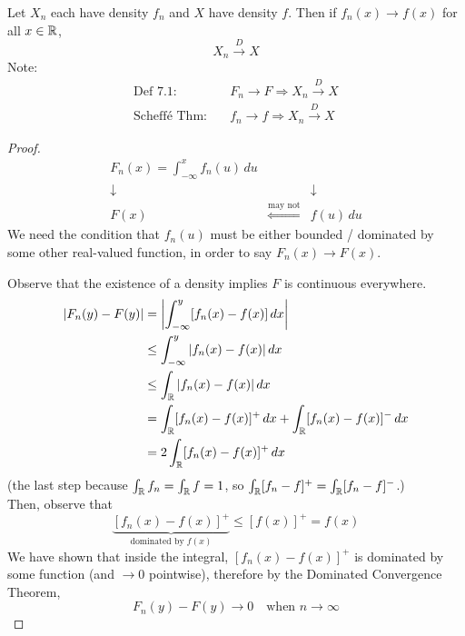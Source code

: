 \begin{theorem}
    Let $X_n$ each have density $f_n$ and $X$ have density $f$. Then if $f_n(x) \to f(x)$ for all $x \in \mathbb{R}$,
    \[X_n \overset{D}{\longrightarrow} X\]
    Note:
    \begin{align*}
        \text{Def 7.1:} & \quad F_n \to F \Rightarrow X_n \overset{D}{\longrightarrow} X\\
        \text{Scheff\'e Thm:} & \quad f_n \to f \Rightarrow X_n \overset{D}{\longrightarrow} X
    \end{align*}
    \begin{proof}
        \[\begin{array}{ccc}
            F_n(x) = \displaystyle\int_{-\infty}^x f_n(u)\,du & & \\
            \downarrow & & \downarrow\\
            F(x) & \overset{\text{may not}}{\Leftarrow} & f(u)\,du
        \end{array}\]
        We need the condition that $f_n(u)$ must be either bounded / dominated by some other real-valued function, in order to say $F_n(x) \to F(x)$.

        Observe that the existence of a density implies $F$ is continuous everywhere.
        \begin{align*}
            |F_n(y) - F(y)| &= \left|\int_{-\infty}^y [f_n(x) - f(x)]\,dx\right|\\
            &\leq \int_{-\infty}^y |f_n(x) - f(x)|\,dx\\
            &\leq \int_{\mathbb{R}} |f_n(x) - f(x)|\,dx\\
            &= \int_{\mathbb{R}} [f_n(x) - f(x)]^+\,dx + \int_{\mathbb{R}} [f_n(x) - f(x)]^-\,dx\\
            &= 2\int_{\mathbb{R}} [f_n(x) - f(x)]^+\,dx
        \end{align*}
        (the last step because $\int_{\mathbb{R}} f_n = \int_{\mathbb{R}} f = 1$, so $\int_{\mathbb{R}} [f_n - f]^+ = \int_{\mathbb{R}} [f_n - f]^-$.)
        \\Then, observe that
        \[\underbrace{[f_n(x) - f(x)]^+}_{\text{dominated by } f(x)} \leq [f(x)]^+ = f(x)\]
        We have shown that inside the integral, $[f_n(x) - f(x)]^+$ is dominated by some function (and $\to 0$ pointwise), therefore by the Dominated Convergence Theorem,
        \[F_n(y) - F(y) \to 0 \quad \text{when } n \to \infty\]
    \end{proof}
\end{theorem}

